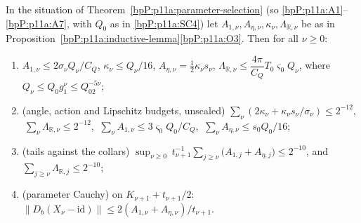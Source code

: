 \begin{lemma}\label{bpP:p11a:exported-sums}
In the situation of Theorem~\ref{bpP:p11a:parameter-selection} (so \ref{bpP:p11a:A1}--\ref{bpP:p11a:A7}, with $Q_0$ as in \ref{bpP:p11a:SC4}) let $A_{1,\nu},A_{\eta,\nu},\kappa_\nu,\Lambda_{\mathbb R,\nu}$ be as in Proposition~\ref{bpP:p11a:inductive-lemma}\ref{bpP:p11a:O3}. Then for all $\nu\ge0$:
\begin{enumerate}[label=(E\arabic*),ref=(E\arabic*)]
\item\label{bpP:p11a:E1} $A_{1,\nu}\le2\sigma_\nu Q_\nu/C_Q$, $\kappa_\nu\le Q_\nu/16$, $A_{\eta,\nu}=\frac12\kappa_\nu s_\nu$, $\Lambda_{\mathbb R,\nu}\le\dfrac{4\pi}{C_Q}T_0\varsigma_0Q_\nu$, where $Q_\nu\le Q_0g_1^\nu\le Q_02^{-5\nu}$;
\item\label{bpP:p11a:E2} (angle, action and Lipschitz budgets, unscaled) $\sum_\nu(2\kappa_\nu+\kappa_\nu s_\nu/\sigma_\nu)\le2^{-12}$, $\ \sum_\nu\Lambda_{\mathbb R,\nu}\le2^{-12}$, $\ \sum_\nu A_{1,\nu}\le3\varsigma_0Q_0/C_Q$, $\ \sum_\nu A_{\eta,\nu}\le s_0Q_0/16$;
\item\label{bpP:p11a:E3} (tails against the collars) $\displaystyle\sup_{\nu\ge0}\ t_{\nu+1}^{-1}\sum_{j\ge\nu}\bigl(A_{1,j}+A_{\eta,j}\bigr)\le2^{-10}$, and $\sum_{j\ge\nu}\Lambda_{\mathbb R,j}\le2^{-10}$;
\item\label{bpP:p11a:E4} (parameter Cauchy) on $K_{\nu+1}+t_{\nu+1}/2$: $\lVert D_b(X_\nu-\mathrm{id})\rVert\le2(A_{1,\nu}+A_{\eta,\nu})/t_{\nu+1}$.
\end{enumerate}
\end{lemma}
